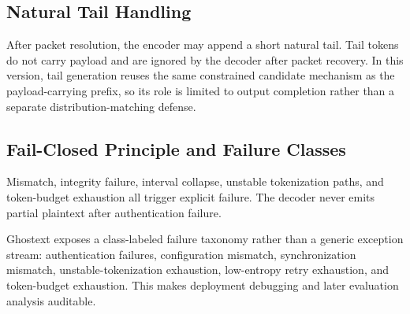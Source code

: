 \subsection{Natural Tail Handling}

After packet resolution, the encoder may append a short natural tail. Tail tokens do not carry payload and are ignored by the decoder after packet recovery. In this version, tail generation reuses the same constrained candidate mechanism as the payload-carrying prefix, so its role is limited to output completion rather than a separate distribution-matching defense.

\subsection{Fail-Closed Principle and Failure Classes}

Mismatch, integrity failure, interval collapse, unstable tokenization paths, and token-budget exhaustion all trigger explicit failure. The decoder never emits partial plaintext after authentication failure.

Ghostext exposes a class-labeled failure taxonomy rather than a generic exception stream: authentication failures, configuration mismatch, synchronization mismatch, unstable-tokenization exhaustion, low-entropy retry exhaustion, and token-budget exhaustion. This makes deployment debugging and later evaluation analysis auditable.

